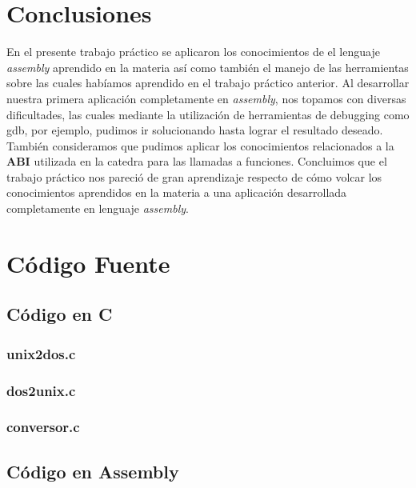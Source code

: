 \documentclass[a4paper,10pt]{article}
\begin{document}
\newpage
\section{Conclusiones}

  En el presente trabajo pr\'actico se aplicaron los conocimientos de el lenguaje \textit{assembly} aprendido en la materia
  as\'i como tambi\'en el manejo de las herramientas sobre las cuales hab\'iamos aprendido en el trabajo pr\'actico
  anterior. Al desarrollar nuestra primera aplicaci\'on completamente en \textit{assembly}, nos topamos con diversas dificultades,
  las cuales mediante la utilizaci\'on de herramientas de debugging como gdb, por ejemplo, pudimos ir solucionando hasta
  lograr el resultado deseado. Tambi\'en consideramos que pudimos aplicar los conocimientos relacionados a la {\bf ABI} 
  utilizada en la catedra para las llamadas a funciones. Concluimos que el trabajo pr\'actico nos pareci\'o de gran aprendizaje
  respecto de c\'omo volcar los conocimientos aprendidos en la materia a una aplicaci\'on desarrollada completamente en lenguaje
  \textit{assembly}.
\appendix
\newpage
\section{C\'odigo Fuente}
  \subsection{C\'odigo en C}
    \subsubsection{unix2dos.c}
      \lstset{numbers=left, frame=single, breaklines=true}
      
    \subsubsection{dos2unix.c}
      \lstset{numbers=left, frame=single, breaklines=true}
      
    \subsubsection{conversor.c}
      \lstset{numbers=left, frame=single, breaklines=true}
      
  \newpage
  \subsection{C\'odigo en Assembly}
\end{document}
